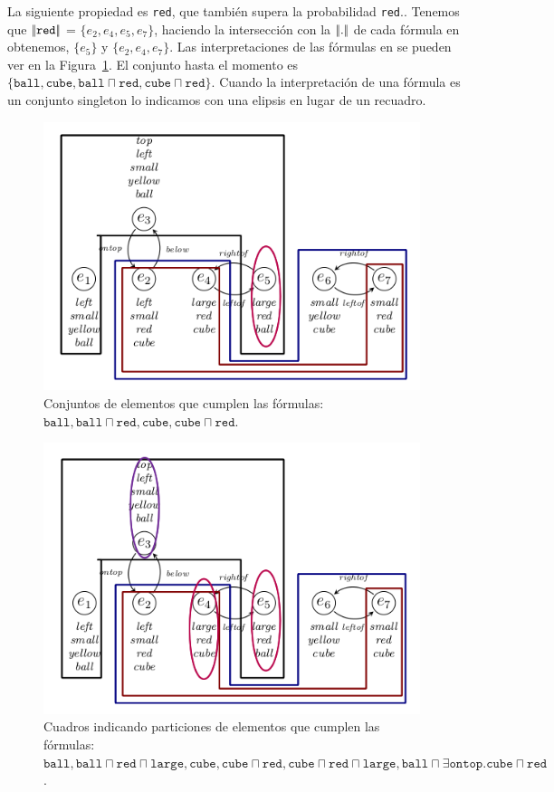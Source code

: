 La siguiente propiedad es \texttt{red}, que tambi\'en supera la probabilidad \texttt{red}.\randomuse. Tenemos que  
$|\!|\texttt{red}|\!|$ = $\{e_2, e_4, e_5, e_7\}$, haciendo la intersecci\'on con la $|\!|.|\!|$ de cada f\'ormula en \RE obtenemos, 
$\{e_5\}$ y $\{e_2, e_4, e_7\}$. Las interpretaciones de las f\'ormulas en \RE se pueden ver en la Figura~\ref{fig-modelo9}. El conjunto \RE hasta el momento es $\{\texttt{ball}, \texttt{cube}, \texttt{ball} \sqcap \texttt{red}, \texttt{cube} \sqcap \texttt{red}\}$. Cuando la interpretaci\'on de una f\'ormula es un conjunto singleton lo indicamos con una elipsis en lugar de un recuadro.

\begin{figure}[H]
\begin{center}
\includegraphics[width=11cm]{images/im/rojo.png}
\caption{Conjuntos de elementos que cumplen las f\'ormulas: $\texttt{ball}, \texttt{ball} \sqcap \texttt{red}, \texttt{cube},\texttt{cube} \sqcap \texttt{red}$.}
\label{fig-modelo9}
\end{center}
\end{figure}    

\begin{figure}[H]
\begin{center}
\includegraphics[width=11cm]{images/im/ontop.png}
\caption{Cuadros indicando particiones de elementos que cumplen las f\'ormulas: $\texttt{ball}, \texttt{ball} \sqcap \texttt{red} \sqcap \texttt{large}, \texttt{cube},\texttt{cube} \sqcap \texttt{red}, \texttt{cube} \sqcap \texttt{red} \sqcap \texttt{large},\texttt{ball} \sqcap \exists \texttt{ontop}. \texttt{cube} \sqcap \texttt{red}$.}
\label{fig-modelo9c}
\end{center}
\end{figure}

